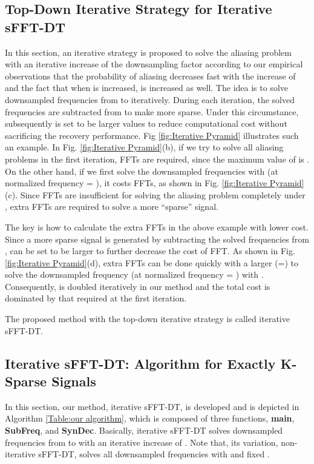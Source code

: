 \documentclass[journal,onecolumn,11pt]{IEEEtran}
\begin{document}
\subsection{Top-Down Iterative Strategy for Iterative sFFT-DT}\label{ssec:ItMethod}
In this section, an iterative strategy is proposed to solve the aliasing problem with an iterative increase of the downsampling factor  according to our empirical observations that the probability of aliasing decreases
fast with the increase of  and the fact that when  is increased,  is increased as well.
The idea is to solve downsampled frequencies from  to  iteratively.
During each iteration, the solved frequencies are subtracted from  to make  more sparse.
Under this circumstance,  subsequently is set to be larger values to reduce computational cost without sacrificing the recovery performance.
Fig \ref{fig:Iterative Pyramid} illustrates such an example.
In Fig. \ref{fig:Iterative Pyramid}(b), if we try to solve all aliasing problems in the first iteration,  FFTs are required, since the maximum value of  is .
On the other hand, if we first solve the downsampled frequencies with  (at normalized frequency = ), it costs  FFTs, as shown in Fig. \ref{fig:Iterative Pyramid}(c).
Since  FFTs are insufficient for solving the aliasing problem completely under , extra  FFTs are required to solve a more ``sparse'' signal.

The key is how to calculate the  extra FFTs in the above example with lower cost.
Since a more sparse signal is generated by subtracting the solved frequencies from ,  can be set to be larger to further decrease the cost of FFT.
As shown in Fig. \ref{fig:Iterative Pyramid}(d),  extra FFTs can be done quickly with a larger  (=) to solve the downsampled frequency (at normalized frequency = ) with .
Consequently,  is doubled iteratively in our method and the total cost is dominated by that required at the first iteration.

The proposed method with the top-down iterative strategy is called iterative sFFT-DT.

\subsection{Iterative sFFT-DT: Algorithm for Exactly K-Sparse Signals}\label{ssec:exact_algorithm}

In this section, our method, iterative sFFT-DT, is developed and is depicted in Algorithm \ref{Table:our algorithm}, which is composed of three functions, \textbf{main}, \textbf{SubFreq}, and \textbf{SynDec}.
Basically, iterative sFFT-DT solves downsampled frequencies from  to  with an iterative increase of .
Note that, its variation, non-iterative sFFT-DT, solves all downsampled frequencies with  and fixed .
\end{document}
